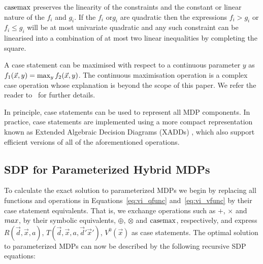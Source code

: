 $\mathrm{casemax}$ preserves the linearity of the constraints and the constant or linear nature of the $f_i$ and $g_i$. If the $f_i$ or$g_i$ are quadratic then the expressions $f_i > g_i$ or $f_i \leq g_i$ will be at most univariate quadratic and any such constraint can be linearised into a combination of at most two linear inequalities by completing the square. 

A case statement can be maximised with respect to a continuous parameter $y$ as {\small $ f_1(\vec{x}, y) = \contmax_{y}f_2(\vec{x}, y) $}. The continuous maximisation operation is a complex case operation whose explanation is beyond the scope of this paper. We refer the reader to~\parencite{Zamani_AAAI_2012} for further details.

In principle, case statements can be used to represent all MDP components. In practice, case statements are implemented using a more compact representation known as Extended Algebraic Decision Diagrams (XADDs) \parencite{Sanner_UAI_2011}, which also support efficient versions of all of the aforementioned operations.

\subsection{SDP for Parameterized Hybrid MDPs}

To calculate the exact solution to parameterized MDPs we begin by replacing all functions and operations in Equations~\eqref{eq:vi_qfunc} and~\eqref{eq:vi_vfunc} by their case statement equivalents. That is, we exchange operations such as $+$, $\times$ and $\mathnormal{max}$, by their symbolic equivalents, $\oplus$, $\otimes$ and $\mathrm{casemax}$, respectively, and express {\small $R(\vec{d}, \vec{x}, a)$},  {\small $T(\vec{d}, \vec{x}, a, \vec{d}' \vec{x}')$}, {\small $V^0(\vec{x})$} as case statements. The optimal solution to parameterized MDPs can now be described by the following recursive SDP equations:

